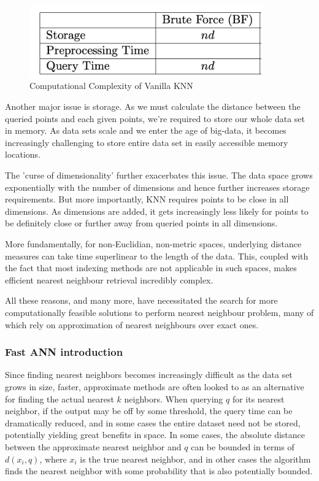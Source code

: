 \begin{figure}[h!]
    \centering
    \includegraphics[width=10cm]{chapter_11/files/vanilla.png}
    \caption{Computational Complexity of Vanilla KNN}    
\end{figure}

Another major issue is storage. As we must calculate the distance between the queried points and each given points, we're required to store our whole data set in memory. As data sets scale and we enter the age of big-data, it becomes increasingly challenging to store  entire data set in easily accessible memory locations.\newline

The 'curse of dimensionality' further exacerbates this issue. The data space grows exponentially with the number of dimensions and hence further increases storage requirements. But more importantly, KNN requires points to be close in all dimensions. As dimensions are added, it gets increasingly less likely for points to be definitely close or further away from queried points in all dimensions. \newline

More fundamentally, for non-Euclidian, non-metric spaces, underlying distance measures can take time superlinear to the length of the data. This, coupled with the fact that most indexing methods are not applicable in such spaces, makes efficient nearest neighbour retrieval incredibly complex. 

All these reasons, and many more, have necessitated the search for more computationally feasible solutions to perform nearest neighbour problem, many of which rely on approximation of nearest neighbours over exact ones. 

\subsubsection{Fast ANN introduction}
Since finding nearest neighbors becomes increasingly difficult as the data set grows in size, faster, approximate methods are often looked to as an alternative for finding the actual nearest $k$ neighbors. When querying $q$ for its nearest neighbor, if the output may be off by some threshold, the query time can be dramatically reduced, and in some cases the entire dataset need not be stored, potentially yielding great benefits in space. In some cases, the absolute distance between the approximate nearest neighbor and $q$ can be bounded in terms of $d(x_i,q)$, where $x_i$ is the true nearest neighbor, and in other cases the algorithm finds the nearest neighbor with some probability that is also potentially bounded.

